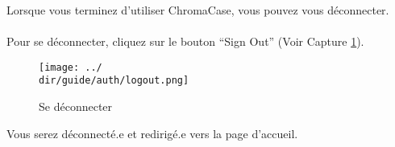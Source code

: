 Lorsque vous terminez d’utiliser ChromaCase, vous pouvez vous déconnecter.
\\\\
Pour se déconnecter, cliquez sur le bouton “Sign Out” (Voir Capture \ref{fig:logout}).

\begin{figure}[H]
	\texttt{[image: ../\\dir/guide/auth/logout.png]}
	\caption{Se déconnecter}
	\label{fig:logout}
\end{figure}

Vous serez déconnecté.e et redirigé.e vers la page d’accueil.